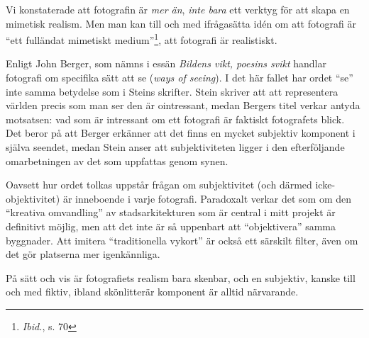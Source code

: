 \documentclass[
]{article}
\begin{document}
Vi konstaterade att fotografin är \emph{mer än}, \emph{inte bara} ett
verktyg för att skapa en mimetisk realism. Men man kan till och med
ifrågasätta idén om att fotografi är ``ett fulländat mimetiskt medium''\footnote{\textit{Ibid.}, s. 70},
att fotografi är realistiskt.

Enligt John Berger, som nämns i essän \emph{Bildens vikt, poesins svikt} handlar fotografi om specifika sätt att se (\emph{ways of seeing}). I
det här fallet har ordet ``se'' inte samma betydelse som i Steins
skrifter. Stein skriver att att representera världen precis som man ser
den är ointressant, medan Bergers titel verkar antyda motsatsen: vad som
är intressant om ett fotografi är faktiskt fotografets blick. Det beror
på att Berger erkänner att det finns en mycket subjektiv komponent i
själva seendet, medan Stein anser att subjektiviteten ligger i den
efterföljande omarbetningen av det som uppfattas genom synen.

Oavsett hur ordet tolkas uppstår frågan om subjektivitet (och därmed
icke-objektivitet) är inneboende i varje fotografi. Paradoxalt verkar
det som om den ``kreativa omvandling'' av stadsarkitekturen som är
central i mitt projekt är definitivt möjlig, men att det inte är så
uppenbart att ``objektivera'' samma byggnader. Att imitera
``traditionella vykort'' är också ett särskilt filter, även om det gör
platserna mer igenkännliga.

På sätt och vis är fotografiets realism bara skenbar, och en subjektiv,
kanske till och med fiktiv, ibland skönlitterär komponent är alltid
närvarande.



\end{document}
